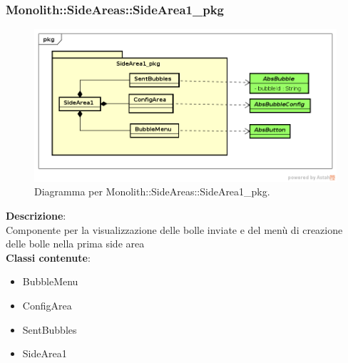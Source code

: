 \clearpage

\subsubsection{Monolith::SideAreas::SideArea1\_pkg}
   \FloatBarrier
   \begin{figure}[ht]
   \centering
\includegraphics[width=\textwidth,keepaspectratio]{img/sd1_pkg}
   \caption{Diagramma per Monolith::SideAreas::SideArea1\_pkg.}
\end{figure}
\FloatBarrier
\textbf{Descrizione}:\\
 Componente per la visualizzazione delle bolle inviate e del menù di creazione delle bolle nella prima side area 
\\ \textbf{Classi contenute}:\\
\begin{itemize}
\item BubbleMenu
\item ConfigArea
\item SentBubbles
\item SideArea1
\end{itemize}


\clearpage

